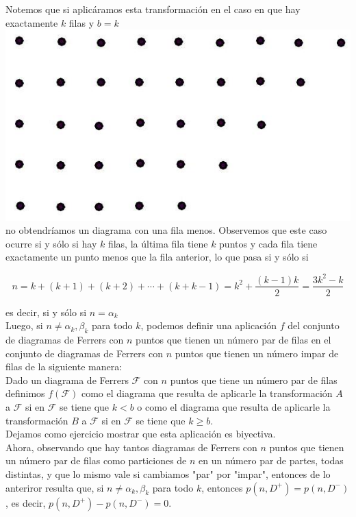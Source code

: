 \documentclass[10pt]{article}
\begin{document}
Notemos que si aplicáramos esta transformación en el caso en que hay exactamente $k$ filas y $b=k$\\
\includegraphics[max width=\textwidth, center]{2025_09_05_3ba26226ec0baddb5a03g-37}\\
no obtendríamos un diagrama con una fila menos. Observemos que este caso ocurre si y sólo si hay $k$ filas, la última fila tiene $k$ puntos y cada fila tiene exactamente un punto menos que la fila anterior, lo que pasa si y sólo si

$$
n=k+(k+1)+(k+2)+\cdots+(k+k-1)=k^{2}+\frac{(k-1) k}{2}=\frac{3 k^{2}-k}{2}
$$

es decir, si y sólo si $n=\alpha_{k}$\\
Luego, si $n \neq \alpha_{k}, \beta_{k}$ para todo $k$, podemos definir una aplicación $f$ del conjunto de diagramas de Ferrers con $n$ puntos que tienen un número par de filas en el conjunto de diagramas de Ferrers con $n$ puntos que tienen un número impar de filas de la siguiente manera:\\
Dado un diagrama de Ferrers $\mathcal{F}$ con $n$ puntos que tiene un número par de filas definimos $f(\mathcal{F})$ como el diagrama que resulta de aplicarle la transformación $A$ a $\mathcal{F}$ si en $\mathcal{F}$ se tiene que $k<b$ o como el diagrama que resulta de aplicarle la transformación $B$ a $\mathcal{F}$ si en $\mathcal{F}$ se tiene que $k \geq b$.\\
Dejamos como ejercicio mostrar que esta aplicación es biyectiva.\\
Ahora, observando que hay tantos diagramas de Ferrers con $n$ puntos que tienen un número par de filas como particiones de $n$ en un número par de partes, todas distintas, y que lo mismo vale si cambiamos "par" por "impar", entonces de lo anteriror resulta que, si $n \neq \alpha_{k}, \beta_{k}$ para todo $k$, entonces $p\left(n, D^{+}\right)=p\left(n, D^{-}\right)$, es decir, $p\left(n, D^{+}\right)-p\left(n, D^{-}\right)=0$.
\end{document}
